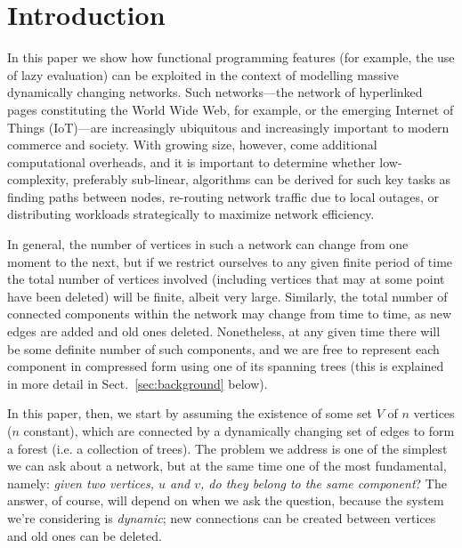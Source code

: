 \section{Introduction}
\label{sec:Intro}

In this paper we show how functional programming features (for example, the use of lazy evaluation) can be exploited in the context of modelling massive dynamically changing networks. Such networks---the network of hyperlinked pages constituting the World Wide Web, for example, or the emerging Internet of Things (IoT)---are increasingly ubiquitous and increasingly important to modern commerce and society. With growing size, however, come additional computational overheads, and it is important to determine whether low-complexity, preferably sub-linear, algorithms can be derived for such key tasks as finding paths between nodes, re-routing network traffic due to local outages, or distributing workloads strategically to maximize network efficiency.



In general, the number of vertices in such a network can change from one moment to the next, but if we restrict ourselves to any given finite period of time the total number of vertices involved (including vertices that may at some point have been deleted) will be finite, albeit very large. Similarly, the total number of connected components within the network may change from time to time, as new edges are added and old ones deleted. Nonetheless, at any given time there will be some definite number of such components, and we are free to represent each component in compressed form using one of its spanning trees (this is explained in more detail in Sect.~\ref{sec:background} below). 

In this paper, then, we start by assuming the existence of some set $V$ of $n$ vertices ($n$ constant), which are connected by a dynamically changing set of edges to form a forest (i.e. a collection of trees). The problem we address is one of the simplest we can ask about a network, but at the same time one of the most fundamental, namely: \emph{given two vertices, $u$ and $v$, do they belong to the same component}? The answer, of course, will depend on when we ask the question, because the system we're considering is \emph{dynamic}; new connections can be created between vertices and old ones can be deleted. 

